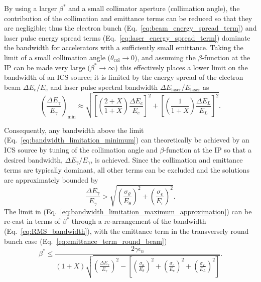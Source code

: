 \documentclass[../main.tex]{subfiles}
\begin{document}
By using a larger $\beta^{*}$ and a small collimator aperture (collimation angle), the contribution of the collimation and emittance terms can be reduced so that they are negligible; thus the electron bunch (Eq.~\ref{eq:beam_energy_spread_term}) and laser pulse energy spread terms (Eq.~\ref{eq:laser_energy_spread_term}) dominate the bandwidth for accelerators with a sufficiently small emittance. Taking the limit of a small collimation angle ($\theta_{\mathrm{col}}\rightarrow 0$), and assuming the $\beta$-function at the IP can be made very large ($\beta^{*}\rightarrow \infty$) this effectively places a lower limit on the bandwidth of an ICS source; it is limited by the energy spread of the electron beam $\Delta E_{e}/E_{e}$ and laser pulse spectral bandwidth $\Delta E_{\mathrm{laser}}/E_{\mathrm{laser}}$ as 
\begin{equation}
\left(\frac{\Delta E_{\gamma}}{E_{\gamma}}\right)_{\mathrm{min}} \approx \sqrt{\left[\left(\frac{2+X}{1+X}\right)\frac{\Delta E_{e}}{E_{e}}\right]^{2} + \left[\left(\frac{1}{1+X}\right)\frac{\Delta E_{L}}{E_{L}}\right]^{2}}.
\label{eq:bandwidth_limitation_minimum}
\end{equation}

Consequently, any bandwidth above the 
limit (Eq.~\ref{eq:bandwidth_limitation_minimum}) can theoretically be achieved by an ICS source by tuning of the collimation angle and $\beta$-function at the IP so that a desired bandwidth, $\Delta E_{\gamma}/E_{\gamma}$, is achieved. Since the collimation and emittance terms are typically dominant, all other terms can be excluded and the solutions are approximately bounded by
\begin{equation}
\frac{\Delta E_{\gamma}}{E_{\gamma}} > \sqrt{\left(\frac{ \sigma_{\theta}}{E_{\theta}}\right)^{2}+\left(\frac{\sigma_{\epsilon}}{E_{\epsilon}}\right)^{2}}.
\label{eq:bandwidth_limitation_maximum_approximation}
\end{equation}
The limit in (Eq.~\ref{eq:bandwidth_limitation_maximum_approximation}) can be re-cast in terms of $\beta^{*}$ through a re-arrangement of the bandwidth (Eq.~\ref{eq:RMS_bandwidth}), with the emittance term in the transversely round bunch case (Eq.~\ref{eq:emittance_term_round_beam})
\begin{equation}
\beta^{*} \leq \frac{2\gamma\epsilon_{n}}{\left(1+X\right)\sqrt{\left(\frac{\Delta E_{\gamma}}{E_{\gamma}}\right)^{2}-\left[\left(\frac{\sigma_{\theta}}{E_{\theta}}\right)^{2}+\left(\frac{\sigma_{e}}{E_{e}}\right)^{2}+\left(\frac{\sigma_{L}}{E_{L}}\right)^{2}\right]}}.
\label{eq:beta_star_maximum_limitation}
\end{equation}
\end{document}

